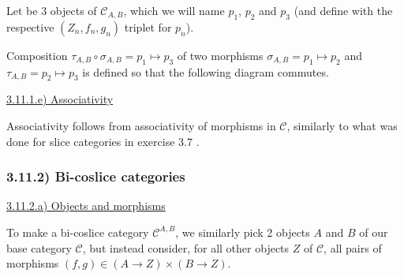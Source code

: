 Let be 3 objects of $\mathcal{C}_{A,B}$, which we will name $p_1$, $p_2$ and $p_3$ (and define with the respective $(Z_n, f_n, g_n)$ triplet for $p_n$).

Composition $\tau_{A, B} \circ \sigma_{A, B} = p_1 \mapsto p_3$ of two morphisms $\sigma_{A, B} = p_1 \mapsto p_2$ and $\tau_{A, B} = p_2 \mapsto p_3$ is defined so that the following diagram commutes.



\vspace{5mm}
\underline{3.11.1.e) Associativity}

Associativity follows from associativity of morphisms in $\mathcal{C}$, similarly to what was done for slice categories in exercise 3.7 .



\subsubsection*{3.11.2) Bi-coslice categories}

\vspace{5mm}
\underline{3.11.2.a) Objects and morphisms}

To make a bi-coslice category $\mathcal{C}^{A,B}$, we similarly pick 2 objects $A$ and $B$ of our base category $\mathcal{C}$, but instead consider, for all other objects $Z$ of $\mathcal{C}$, all pairs of morphisms $(f, g) \in (A \to Z) \times (B \to Z)$.

